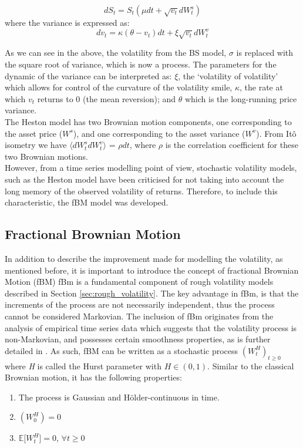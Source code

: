\documentclass[12pt,oneside]{article}
\begin{document}
\begin{equation}
\label{eqn:classic_heston}
dS_t= S_t(\mu dt + \sqrt{v_t} dW_t^{s})
\end{equation}
where the variance is expressed as: 
\begin{equation}
\label{eqn:classic_heston_var}
dv_t = \kappa (\theta - v_t)dt + \xi\sqrt{v_t}dW_t^{v}
\end{equation}

As we can see in the above, the volatility from the BS model, $\sigma$ is replaced with the square root of variance, which is now a process. The parameters for the dynamic of the variance can be interpreted as: $\xi$, the `volatility of volatility' which allows for control of the curvature of the volatility smile, $\kappa$, the rate at which $v_t$ returns to 0 (the mean reversion); and $\theta$ which is the long-running price variance. 
\\

The Heston model has two Brownian motion components, one corresponding to the asset price ($W^s$), and one corresponding to the asset variance ($W^v$). From It\^o isometry we have $\langle  dW_t^{s} dW_t^{v}\rangle$ = $\rho dt$, where $\rho$ is the correlation coefficient for these two Brownian motions.
\\

However, from a time series modelling point of view, stochastic volatility models, such as the Heston model have been criticised for not taking into account the long memory of the observed volatility of returns. Therefore, to include this characteristic, the fBM model was developed. 

\subsection{Fractional Brownian Motion}
\label{sec:fractionalBm}
In addition to describe the improvement made for modelling the volatility, as mentioned before, it is important to introduce the concept of fractional Brownian Motion (fBM) fBm is a fundamental component of rough volatility models described in Section \ref{sec:rough_volatility}. The key  advantage in fBm, is that the increments of the process are not necessarily independent, thus the process cannot be considered Markovian. The inclusion of fBm originates from the analysis of empirical time series data which suggests that the volatility process is non-Markovian, and possesses certain smoothness properties, as is further detailed in \cite{Gatheral2014}. As such, fBM can be written as a stochastic process $(W^H_t)_{t\ge0}$ where \textit{H} is called the Hurst parameter with $\textit{H} \in (0,1)$. Similar to the classical Brownian motion, it has the following properties: 
\begin{enumerate} 
\item The process is Gaussian and H\"{o}lder-continuous in time. 
\item $(\textit{$W^H_0$})=0$  
\item $\mathbb{E}$[\textit{$W^H_t$}]$=0$,
$\forall t \ge 0$ 
\end{enumerate}
\end{document}
